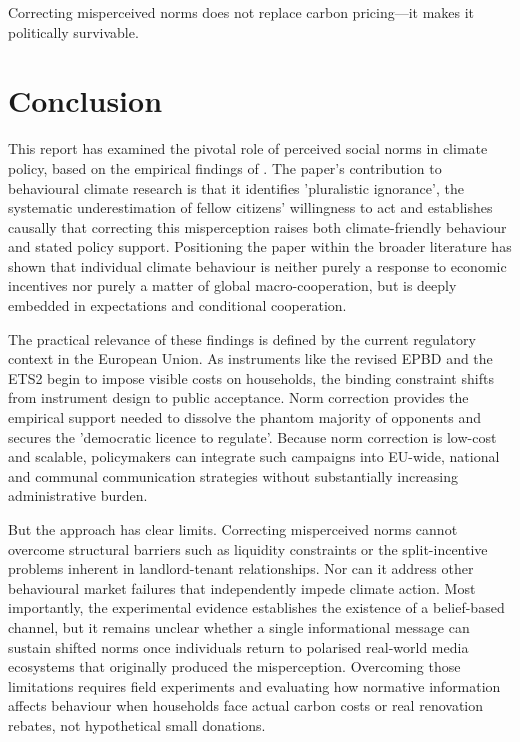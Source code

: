 \documentclass[11pt,a4paper]{scrartcl}
\numberwithin{equation}{section}
\theoremstyle{definition}
\theoremstyle{remark}
\newenvironment{keymessage}[1][Key Message]{%
  \begin{tcolorbox}[title=#1]%
}{%
  \end{tcolorbox}%
}
\begin{document}
    \begin{keymessage}
    Correcting misperceived norms does not replace carbon pricing---it makes
    it politically survivable.
    \end{keymessage}

\section{Conclusion}
\label{sec:Conclusion}

    This report has examined the pivotal role of perceived social norms in climate policy, based on the empirical findings of \textcite{andre2024}. The paper's contribution to behavioural climate research is that it identifies 'pluralistic ignorance', the systematic underestimation of fellow citizens' willingness to act and establishes causally that correcting this misperception raises both climate-friendly behaviour and stated policy support. Positioning the paper within the broader literature has shown that individual climate behaviour is neither purely a response to economic incentives nor purely a matter of global macro-cooperation, but is deeply embedded in expectations and conditional cooperation.
    
    The practical relevance of these findings is defined by the current regulatory context in the European Union. As instruments like the revised EPBD and the ETS2 begin to impose visible costs on households, the binding constraint shifts from instrument design to public acceptance. Norm correction provides the empirical support needed to dissolve the phantom majority of opponents and secures the 'democratic licence to regulate'. Because norm correction is low-cost and scalable, policymakers can integrate such campaigns into EU-wide, national and communal communication strategies without substantially increasing administrative burden.
    
    But the approach has clear limits. Correcting misperceived norms cannot overcome structural barriers such as liquidity constraints or the split-incentive problems inherent in landlord-tenant relationships. Nor can it address other behavioural market failures that independently impede climate action. Most importantly, the experimental evidence establishes the existence of a belief-based channel, but it remains unclear whether a single informational message can sustain shifted norms once individuals return to polarised real-world media ecosystems that originally produced the misperception. Overcoming those limitations requires field experiments and evaluating how normative information affects behaviour when households face actual carbon costs or real 
    renovation rebates, not hypothetical small donations.
    
\end{document}
